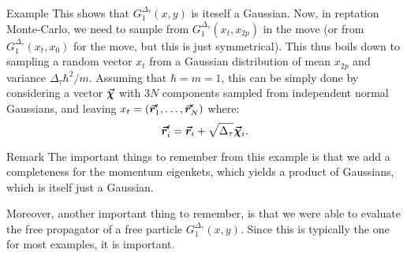 \documentclass[a4paper]{article}
\begin{document}
\begin{parag}{Example}
    This shows that $G_1^{\Delta_{\tau}}\left(x, y\right)$ is iteself a Gaussian. Now, in reptation Monte-Carlo, we need to sample from $G_{1}^{\Delta_{\tau}}\left(x_t, x_{2p}\right)$ in the  move (or from $G_1^{\Delta_{\tau}}\left(x_t, x_0\right)$ for the  move, but this is just symmetrical). This thus boils down to sampling a random vector $x_t$ from a Gaussian distribution of mean $x_{2p}$ and variance $\Delta_{\tau} \hbar^2 / m$. Assuming that $\hbar = m = 1$, this can be simply done by considering a vector $\bm{\protect\vec{\chi}}$ with $3N$ components sampled from independent normal Gaussians, and leaving $x_t = \left(\bvec{r}_1', \ldots, \bvec{r}_N'\right)$ where: 
    \[\bm{\protect\vec{r}}_i' = \bm{\protect\vec{r}}_i + \sqrt{\Delta_{\tau}} \bm{\protect\vec{\chi}}_i.\]
    
    \begin{subparag}{Remark}
        The important things to remember from this example is that we add a completeness for the momentum eigenkets, which yields a product of Gaussians, which is itself just a Gaussian.

        Moreover, another important thing to remember, is that we were able to evaluate the free propagator of a free particle $G_1^{\Delta_{\tau}}\left(x, y\right)$. Since this is typically the one for most examples, it is important.
    \end{subparag}
\end{parag}
\end{document}
